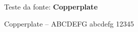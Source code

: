 \documentclass{article}
\begin{document}
Teste da fonte: \textbf{Copperplate}

{\Large Copperplate – ABCDEFG abcdefg 12345}
\end{document}
